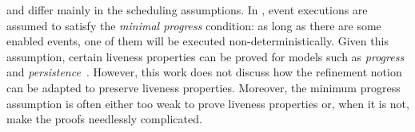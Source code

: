 
\unitb and \eventB differ mainly in the scheduling
assumptions.  In \eventB, event executions are assumed to
satisfy the \emph{minimal progress} condition: as long
as there are some enabled events, one of them will be executed non-deterministically. %
Given this assumption, certain liveness properties can be proved
for \eventB models such as \emph{progress} and
\emph{persistence}~\cite{hoang11:_reason_liven_proper_event_b}.
However, this work does not discuss how the refinement notion can be
adapted to preserve liveness properties.  Moreover, the
minimum progress assumption is often either too weak to prove
liveness properties or, when it is not, make the proofs needlessly 
complicated.

